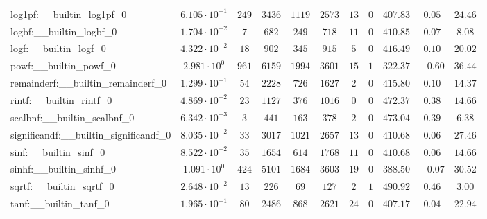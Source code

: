 \begin{tabular}{|l|c|c|c|c|c|c|c|c|c|c|}
log1pf:\_\_builtin\_log1pf\_0             & $ 6.105 \cdot 10^{-1} $ & $ 249    $ & $ 3436  $ & $ 1119  $ & $ 2573  $ & $ 13  $ & $ 0 $ & $ 407.83      $ & $ 0.05    $ & $ 24.46   $ \\
logbf:\_\_builtin\_logbf\_0               & $ 1.704 \cdot 10^{-2} $ & $ 7      $ & $ 682   $ & $ 249   $ & $ 718   $ & $ 11  $ & $ 0 $ & $ 410.85      $ & $ 0.07    $ & $ 8.08    $ \\
logf:\_\_builtin\_logf\_0                 & $ 4.322 \cdot 10^{-2} $ & $ 18     $ & $ 902   $ & $ 345   $ & $ 915   $ & $ 5   $ & $ 0 $ & $ 416.49      $ & $ 0.10    $ & $ 20.02   $ \\
powf:\_\_builtin\_powf\_0                 & $ 2.981 \cdot 10^{0}  $ & $ 961    $ & $ 6159  $ & $ 1994  $ & $ 3601  $ & $ 15  $ & $ 1 $ & $ 322.37      $ & $ -0.60   $ & $ 36.44   $ \\
remainderf:\_\_builtin\_remainderf\_0     & $ 1.299 \cdot 10^{-1} $ & $ 54     $ & $ 2228  $ & $ 726   $ & $ 1627  $ & $ 2   $ & $ 0 $ & $ 415.80      $ & $ 0.10    $ & $ 14.37   $ \\
rintf:\_\_builtin\_rintf\_0               & $ 4.869 \cdot 10^{-2} $ & $ 23     $ & $ 1127  $ & $ 376   $ & $ 1016  $ & $ 0   $ & $ 0 $ & $ 472.37      $ & $ 0.38    $ & $ 14.66   $ \\
scalbnf:\_\_builtin\_scalbnf\_0           & $ 6.342 \cdot 10^{-3} $ & $ 3      $ & $ 441   $ & $ 163   $ & $ 378   $ & $ 2   $ & $ 0 $ & $ 473.04      $ & $ 0.39    $ & $ 6.38    $ \\
significandf:\_\_builtin\_significandf\_0 & $ 8.035 \cdot 10^{-2} $ & $ 33     $ & $ 3017  $ & $ 1021  $ & $ 2657  $ & $ 13  $ & $ 0 $ & $ 410.68      $ & $ 0.06    $ & $ 27.46   $ \\
sinf:\_\_builtin\_sinf\_0                 & $ 8.522 \cdot 10^{-2} $ & $ 35     $ & $ 1654  $ & $ 614   $ & $ 1768  $ & $ 11  $ & $ 0 $ & $ 410.68      $ & $ 0.06    $ & $ 14.66   $ \\
sinhf:\_\_builtin\_sinhf\_0               & $ 1.091 \cdot 10^{0}  $ & $ 424    $ & $ 5101  $ & $ 1684  $ & $ 3603  $ & $ 19  $ & $ 0 $ & $ 388.50      $ & $ -0.07   $ & $ 30.52   $ \\
sqrtf:\_\_builtin\_sqrtf\_0               & $ 2.648 \cdot 10^{-2} $ & $ 13     $ & $ 226   $ & $ 69    $ & $ 127   $ & $ 2   $ & $ 1 $ & $ 490.92      $ & $ 0.46    $ & $ 3.00    $ \\
tanf:\_\_builtin\_tanf\_0                 & $ 1.965 \cdot 10^{-1} $ & $ 80     $ & $ 2486  $ & $ 868   $ & $ 2621  $ & $ 24  $ & $ 0 $ & $ 407.17      $ & $ 0.04    $ & $ 22.94   $ \\

\end{tabular}
